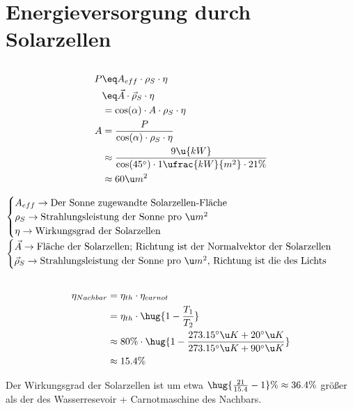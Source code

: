 \documentclass[11pt, german]{article}
\begin{document}
\section{Energieversorgung durch Solarzellen}
\subsection{}
\begin{align*}
    P &\eq A_{eff} \cdot \rho_S \cdot \eta \\
    &\eq \vec A  \cdot \vec\rho_S \cdot \eta\\ 
    &= \cos(\alpha) \cdot A \cdot \rho_S \cdot\eta \\
    A &= \frac{P}{\cos(\alpha)\cdot \rho_S \cdot\eta }\\
    &\approx \frac{9\u{kW}}{\cos(45^\circ)\cdot 1\ufrac{kW}{m^2} \cdot 21\%}\\
    &\approx 60 \u m^2
\end{align*}
\begin{adjustwidth}{20pt}{}
    \con $\begin{cases}
        A_{eff} \rightarrow \text{Der Sonne zugewandte Solarzellen-Fläche}\\
        \rho_S \rightarrow \text{Strahlungsleistung der Sonne pro $\u m^2$}\\
        \eta \rightarrow \text{Wirkungsgrad der Solarzellen}\\
    \end{cases}$\\
    \con $\begin{cases}
        \vec A \rightarrow \text{Fläche der Solarzellen; Richtung ist der Normalvektor der Solarzellen}\\
        \vec \rho_S \rightarrow \text{Strahlungsleistung der Sonne pro $\u m^2$, Richtung ist die des Lichts}\\
    \end{cases}$
\end{adjustwidth}

\subsection{}
\begin{align*}
    \eta_{Nachbar} &= \eta_{th}\cdot \eta_{carnot}\\
    &= \eta_{th}\cdot \hug{1 - \frac{T_1}{T_2}}\\
    &\approx 80\%\cdot \hug{1 - \frac{273.15^\circ \u K + 20^\circ \u K}{273.15^\circ \u K + 90^\circ \u K}}\\
    &\approx 15.4\%\\
\end{align*}
\begin{adjustwidth}{20pt}{}
    Der Wirkungsgrad der Solarzellen ist um etwa $\hug{\frac{21}{15.4}-1}\% \approx 36.4\%$ größer 
    als der des Wasserresevoir + Carnotmaschine des Nachbars.
\end{adjustwidth}
\end{document}
